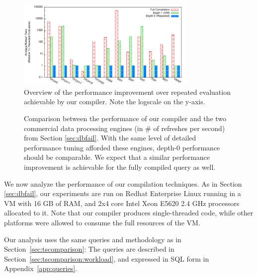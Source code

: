 
\newcommand{\figurewidth}[0]{1.8in}

\newcommand{\tablefig}[1]{
  \hspace*{-0.25in}
  \texttt{[image: ../graphs/graphs/\#1]}
}

\begin{figure}
\begin{center}
\includegraphics[width=3.4in]{../graphs/graphs/bakeoff.pdf}
\caption{Overview of the performance improvement over repeated evaluation achievable by our compiler.  Note the logscale on the y-axis.}
\label{fig:experiments:bakeoff}
\end{center}
\vspace*{-0.2in}
\end{figure}

\begin{figure}
\begin{center}
\resizebox{3.3in}{!}{

}
\caption{Comparison between the performance of our compiler and the two commercial data processing engines (in \# of refreshes per second) from Section \ref{sec:dbfail}.  With the same level of detailed performance tuning afforded these engines, depth-0 performance should be comparable.  We expect that a similar performance improvement is achievable for the fully compiled query as well.}
\label{fig:experiments:enginesVsDBT}
\vspace*{-0.3in}
\end{center}
\end{figure}

We now analyze the performance of our compilation techniques.  As in Section \ref{sec:dbfail}, our experiments are run on Redhat Enterprise Linux running in a VM with 16 GB of RAM, and 2x4 core Intel Xeon E5620 2.4 GHz processors allocated to it.  Note that our compiler produces single-threaded code, while other platforms were allowed to consume the full resources of the VM.

Our analysis uses the same queries and methodology as in Section~\ref{sec:tscomparison}: The queries are described in Section~\ref{sec:tscomparison:workload}, and expressed in SQL form in Appendix~\ref{app:queries}.

